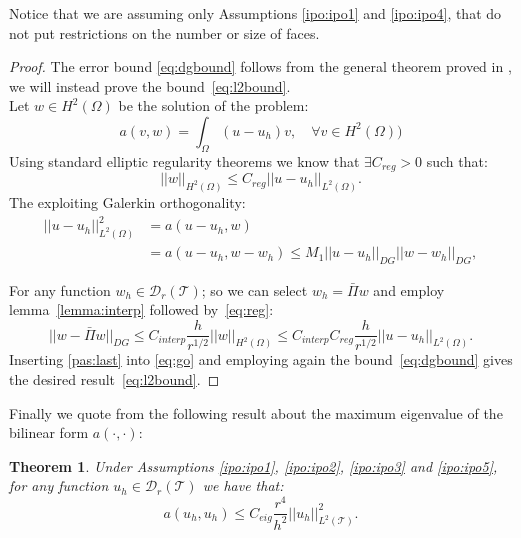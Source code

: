 \documentclass[12pt, a4paper]{article}
\theoremstyle{definition}
\theoremstyle{plain}
\theoremstyle{plain}
\newtheorem{teor}{Theorem}
\begin{document}
Notice that we are assuming only Assumptions \ref{ipo:ipo1} and \ref{ipo:ipo4}, that do not put restrictions on the number or size of faces.
\begin{proof}
	The error bound \eqref{eq:dgbound} follows from the general theorem proved in \cite{hpmet}, we will instead prove the bound~\eqref{eq:l2bound}.\\
	Let $w \in H^2(\Omega)$ be the solution of the problem:
	\begin{equation*}
		a(v, w) = \int_{\Omega} (u-u_h)v, \quad \forall v \in  H^2(\Omega))
	\end{equation*}
	Using standard elliptic regularity theorems we know that $\exists C_{reg}>0$ such that:
	\begin{equation} \label{eq:reg}
		|\!| w |\!|_{H^2(\Omega)} \leq C_{reg} |\!| u - u_h |\!|_{L^2(\Omega)}.
	\end{equation}
	The exploiting Galerkin orthogonality:
	\begin{equation} \label{eq:go}
	\begin{split}
		|\!| u - u_h |\!|^2_{L^2(\Omega)} &= a(u-u_h, w)\\
		&= a(u-u_h, w-w_h) \leq M_1 |\!| u - u_h |\!|_{DG} |\!| w - w_h |\!|_{DG},
	\end{split}
	\end{equation}

	For any function $w_h \in \mathcal{D}_r(\mathcal{T})$; so we can select $w_h = \bar{\Pi}w$ and employ lemma~\ref{lemma:interp} followed by~\eqref{eq:reg}:
	\begin{equation} \label{pas:last}
		|\!|w-\bar{\Pi}w|\!|_{DG} \leq C_{interp} \frac{h}{r^{1/2}} |\!| w |\!|_{H^2(\Omega)} \leq C_{interp}C_{reg} \frac{h}{r^{1/2}} |\!| u-u_h |\!|_{L^2(\Omega)}.
	\end{equation}
	Inserting \eqref{pas:last} into \eqref{eq:go} and employing again the bound~\eqref{eq:dgbound} gives the desired result~\eqref{eq:l2bound}.
\end{proof}	
Finally we quote from \cite{multigrid} the following result about the maximum eigenvalue of the bilinear form $a(\cdot, \cdot)$:
\begin{teor}
	Under Assumptions \ref{ipo:ipo1}, \ref{ipo:ipo2}, \ref{ipo:ipo3} and \ref{ipo:ipo5}, for any function $u_h \in \mathcal{D}_r(\mathcal{T}) $ we have that:
	\begin{equation*}
		a(u_h, u_h) \leq C_{eig} \frac{r^4}{h^2} |\!| u_h |\!|^2_{L^2(\mathcal{T})}.
	\end{equation*}
\end{teor}
\end{document}
